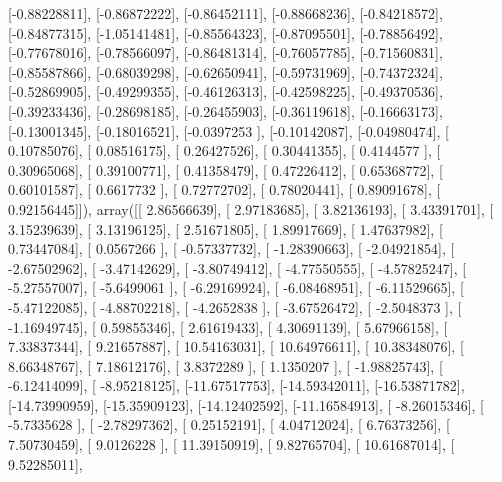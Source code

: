 \documentclass{article}
\begin{document}
       [-0.88228811],
       [-0.86872222],
       [-0.86452111],
       [-0.88668236],
       [-0.84218572],
       [-0.84877315],
       [-1.05141481],
       [-0.85564323],
       [-0.87095501],
       [-0.78856492],
       [-0.77678016],
       [-0.78566097],
       [-0.86481314],
       [-0.76057785],
       [-0.71560831],
       [-0.85587866],
       [-0.68039298],
       [-0.62650941],
       [-0.59731969],
       [-0.74372324],
       [-0.52869905],
       [-0.49299355],
       [-0.46126313],
       [-0.42598225],
       [-0.49370536],
       [-0.39233436],
       [-0.28698185],
       [-0.26455903],
       [-0.36119618],
       [-0.16663173],
       [-0.13001345],
       [-0.18016521],
       [-0.0397253 ],
       [-0.10142087],
       [-0.04980474],
       [ 0.10785076],
       [ 0.08516175],
       [ 0.26427526],
       [ 0.30441355],
       [ 0.4144577 ],
       [ 0.30965068],
       [ 0.39100771],
       [ 0.41358479],
       [ 0.47226412],
       [ 0.65368772],
       [ 0.60101587],
       [ 0.6617732 ],
       [ 0.72772702],
       [ 0.78020441],
       [ 0.89091678],
       [ 0.92156445]]), array([[  2.86566639],
       [  2.97183685],
       [  3.82136193],
       [  3.43391701],
       [  3.15239639],
       [  3.13196125],
       [  2.51671805],
       [  1.89917669],
       [  1.47637982],
       [  0.73447084],
       [  0.0567266 ],
       [ -0.57337732],
       [ -1.28390663],
       [ -2.04921854],
       [ -2.67502962],
       [ -3.47142629],
       [ -3.80749412],
       [ -4.77550555],
       [ -4.57825247],
       [ -5.27557007],
       [ -5.6499061 ],
       [ -6.29169924],
       [ -6.08468951],
       [ -6.11529665],
       [ -5.47122085],
       [ -4.88702218],
       [ -4.2652838 ],
       [ -3.67526472],
       [ -2.5048373 ],
       [ -1.16949745],
       [  0.59855346],
       [  2.61619433],
       [  4.30691139],
       [  5.67966158],
       [  7.33837344],
       [  9.21657887],
       [ 10.54163031],
       [ 10.64976611],
       [ 10.38348076],
       [  8.66348767],
       [  7.18612176],
       [  3.8372289 ],
       [  1.1350207 ],
       [ -1.98825743],
       [ -6.12414099],
       [ -8.95218125],
       [-11.67517753],
       [-14.59342011],
       [-16.53871782],
       [-14.73990959],
       [-15.35909123],
       [-14.12402592],
       [-11.16584913],
       [ -8.26015346],
       [ -5.7335628 ],
       [ -2.78297362],
       [  0.25152191],
       [  4.04712024],
       [  6.76373256],
       [  7.50730459],
       [  9.0126228 ],
       [ 11.39150919],
       [  9.82765704],
       [ 10.61687014],
       [  9.52285011],
\end{document}
